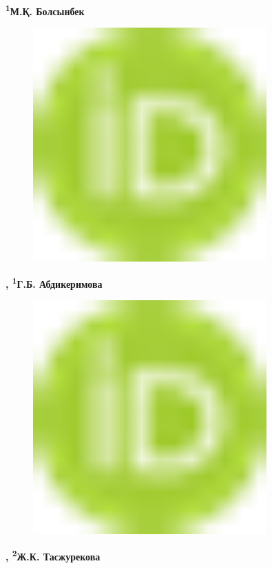 {\bfseries \textsuperscript{1}М.Қ.
Болсынбек}
\begin{figure}[H]
	\centering
	\includegraphics[width=0.8\textwidth]{media/ict/image16}
	\caption*{}
\end{figure}
{\bfseries ,
\textsuperscript{1}Г.Б.
Абдикеримова}
\begin{figure}[H]
	\centering
	\includegraphics[width=0.8\textwidth]{media/ict/image16}
	\caption*{}
\end{figure}
{\bfseries ,
\textsuperscript{2}Ж.К.
Тасжурекова}
